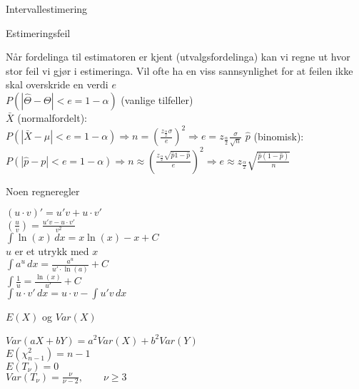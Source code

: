 \documentclass[final,hyperref={pdfpagelabels=false}]{beamer}
\begin{document}
\begin{frame}{}
\begin{columns}[t]
\begin{column}{.25\linewidth}
\begin{block}{\center Intervallestimering}
{\begin{enumerate}
					\end{enumerate}
				}
				\center\normalsize Estimeringsfeil\\
				{\footnotesize\raggedright
					Når fordelinga til estimatoren er kjent (utvalgsfordelinga) kan vi regne ut hvor stor feil vi gjør i estimeringa. Vil ofte ha en viss sannsynlighet for at feilen ikke skal overskride en verdi $e$\\
					$P(|\hat\Theta-\Theta|<e=1-\alpha)$ (vanlige tilfeller)\\
					$\bar X$ (normalfordelt):\\
					$P(|\bar X - \mu|<e=1-\alpha) \Rightarrow n=\left( \frac{z_\frac{\alpha}{2}\sigma}{e}\right)^2\Rightarrow e=z_\frac{\alpha}{2}\frac{\sigma}{\sqrt n}$
					$\hat p$ (binomisk):\\
					$P(|\hat p - p| < e=1-\alpha)\Rightarrow n\approx \left(\frac{z_\frac{\alpha}{2}\sqrt{\hat p {1-\hat p}}}{e}\right)^2\Rightarrow e\approx z_\frac{\alpha}{2}\sqrt{\frac{\hat p(1 - \hat p)}{n}}$
				}
				\center \normalsize Noen regneregler\\
				{\footnotesize\raggedright
					$(u\cdot v)' = u'v + u\cdot v'$\\
					$\left( \frac{u}{v}\right) = \frac{u'v - u\cdot v'}{v^2}$ \\
					$\int \ln (x) \, dx=x\ln (x) -x + C$ \\
					$u$ er et utrykk med $x$\\
					$\int a^u \, dx = \frac{a^u}{u'\cdot \ln(a)} + C$\\
					$\int \frac{1}{u} = \frac{\ln(x)}{u'} + C$ \\
					$\int u \cdot v' \, dx = u\cdot v-\int u'v \, dx$\\
				}
				\center\normalsize $E(X)$ og $Var(X)$\\
				{\footnotesize\raggedright
					$Var(aX+bY)=a^2Var(X)+b^2Var(Y)$\\
					$E(\chi^2_{n-1})=n-1$\\
					$E(T_\nu)=0$\\
					$Var(T_\nu)=\frac \nu {\nu - 2}, \qquad \nu \geq 3$\\
				}
			\end{block}
		\end{column}

\end{columns}
\end{frame}
\end{document}
